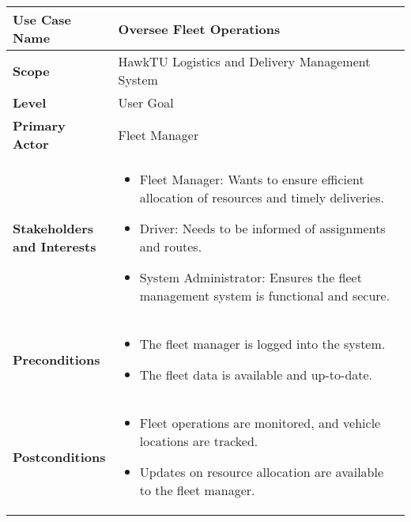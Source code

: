 \documentclass{article}
\begin{document}
\begin{longtable}{|>{\raggedright\arraybackslash}m{0.25\linewidth}|m{0.75\linewidth}|}
\hline
\textbf{Use Case Name} & Oversee Fleet Operations \\
\hline
\textbf{Scope} & HawkTU Logistics and Delivery Management System \\
\hline
\textbf{Level} & User Goal \\
\hline
\textbf{Primary Actor} & Fleet Manager \\
\hline
\textbf{Stakeholders and Interests} & 
\begin{itemize}
    \item Fleet Manager: Wants to ensure efficient allocation of resources and timely deliveries.
    \item Driver: Needs to be informed of assignments and routes.
    \item System Administrator: Ensures the fleet management system is functional and secure.
\end{itemize} \\
\hline
\textbf{Preconditions} & 
\begin{itemize}
    \item The fleet manager is logged into the system.
    \item The fleet data is available and up-to-date.
\end{itemize} \\
\hline
\textbf{Postconditions} & 
\begin{itemize}
    \item Fleet operations are monitored, and vehicle locations are tracked.
    \item Updates on resource allocation are available to the fleet manager.
\end{itemize} \\
\hline
\end{longtable}

\vspace{-2.45em}
\end{document}

